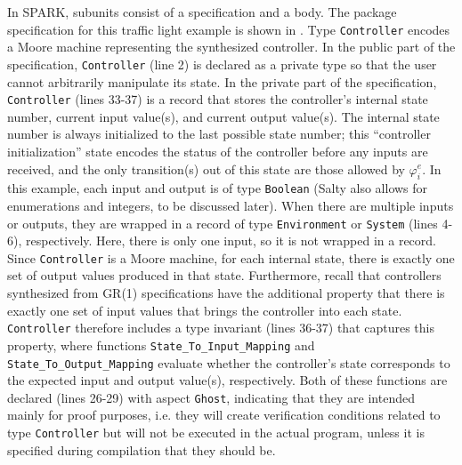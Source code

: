 \documentclass[runningheads]{llncs}
\begin{document}
In SPARK, subunits consist of a specification and a body.
The package specification for this traffic light example is shown in .
Type \lstinline{Controller} encodes a Moore machine representing the synthesized controller. 
In the public part of the specification, \lstinline{Controller} (line 2) is declared as a private type so that the user cannot arbitrarily manipulate its state.  
In the private part of the specification, \lstinline{Controller} (lines 33-37) is a record that stores the controller's internal state number, 
current input value(s), and current output value(s). 
The internal state number is always initialized to the last possible state number; 
this ``controller initialization'' state encodes the status of the controller before any inputs are received, and the only transition(s) out of this state are those allowed by $\varphi_i^e$.
In this example, each input and output is of type \lstinline{Boolean} (Salty also allows for enumerations and integers, to be discussed later). 
When there are multiple inputs or outputs, they are wrapped in a record of type \lstinline{Environment} or \lstinline{System} (lines 4-6), respectively. 
Here, there is only one input, so it is not wrapped in a record. 
Since \lstinline{Controller} is a Moore machine, for each internal state, 
there is exactly one set of output values produced in that state. 
Furthermore, recall that controllers synthesized from GR(1) specifications have the additional property that 
there is exactly one set of input values that brings the controller into each state. 
\lstinline{Controller} therefore includes a type invariant (lines 36-37) that captures this property, 
where functions \lstinline{State_To_Input_Mapping} and \lstinline{State_To_Output_Mapping} evaluate 
whether the controller's state corresponds to the expected input and output value(s), respectively. 
Both of these functions are declared (lines 26-29) with aspect \lstinline{Ghost}, indicating that they are intended mainly for proof purposes, 
i.e. they will create verification conditions related to type \lstinline{Controller} but will not be executed in the actual program, 
unless it is specified during compilation that they should be.
\end{document}
